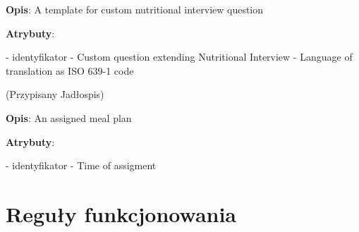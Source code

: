 \begin{enumerate}[label={\textbf{KAT/\protect\threedigits{\theenumi}}}, wide, labelwidth=!, labelindent=0pt, labelsep=0pt, series=reqs]
    \textbf{Opis}: A template for custom nutritional interview question
    \par
    \textbf{Atrybuty}:
    \begin{itemize}[series=atr, wide, align=left, leftmargin=190pt]
         \label{kat:CustomNutritionalInterviewQuestionTemplate:id} - identyfikator
         \label{kat:CustomNutritionalInterviewQuestionTemplate:question} - Custom question extending Nutritional Interview
         \label{kat:CustomNutritionalInterviewQuestionTemplate:language} - Language of translation as ISO 639-1 code
    \end{itemize}

     \label{kat:AssignedMealPlan} (Przypisany Jadłospis)

    \textbf{Opis}: An assigned meal plan
    \par
    \textbf{Atrybuty}:
    \begin{itemize}[series=atr, wide, align=left, leftmargin=190pt]
         \label{kat:AssignedMealPlan:id} - identyfikator
         \label{kat:AssignedMealPlan:assigmentTime} - Time of assigment
    \end{itemize}

\end{enumerate}

\section {Reguły funkcjonowania}\label{sec:functionalRules}

